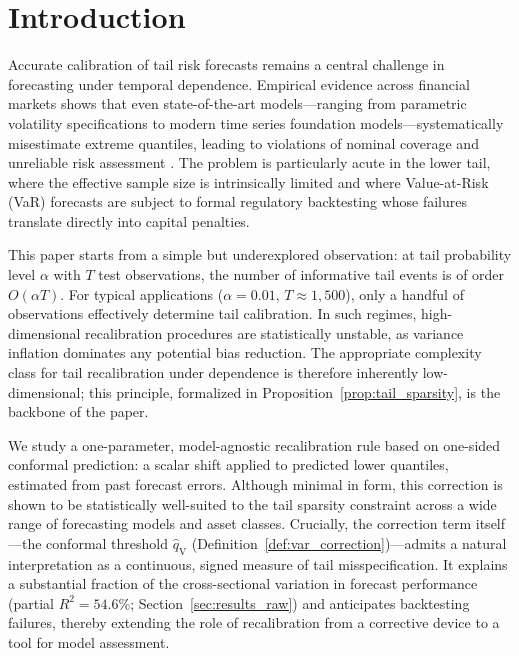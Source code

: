 \documentclass[preprint,11pt,authoryear]{elsarticle}
\newcommand{\1}{\boldsymbol{1}}
\newcommand{\qV}{\hat{q}_{\scriptscriptstyle\mathrm{V}}}
\begin{document}
	\section{Introduction}
	\label{sec:intro}

	Accurate calibration of tail risk forecasts remains a central challenge in forecasting under temporal dependence. Empirical evidence across financial markets shows that even state-of-the-art models---ranging from parametric volatility specifications to modern time series foundation models---systematically misestimate extreme quantiles, leading to violations of nominal coverage and unreliable risk assessment \citep{christoffersen1998, nolde2017elicitability, goel2024tsfmvar, pele2025llmvar}. The problem is particularly acute in the lower tail, where the effective sample size is intrinsically limited and where Value-at-Risk (VaR) forecasts are subject to formal regulatory backtesting \citep{basel1996} whose failures translate directly into capital penalties.

	This paper starts from a simple but underexplored observation: at tail probability level $\alpha$ with $T$ test observations, the number of informative tail events is of order $O(\alpha T)$. For typical applications ($\alpha = 0.01$, $T \approx 1{,}500$), only a handful of observations effectively determine tail calibration. In such regimes, high-dimensional recalibration procedures are statistically unstable, as variance inflation dominates any potential bias reduction. The appropriate complexity class for tail recalibration under dependence is therefore inherently low-dimensional; this principle, formalized in Proposition~\ref{prop:tail_sparsity}, is the backbone of the paper.

	We study a one-parameter, model-agnostic recalibration rule based on one-sided conformal prediction: a scalar shift applied to predicted lower quantiles, estimated from past forecast errors. Although minimal in form, this correction is shown to be statistically well-suited to the tail sparsity constraint across a wide range of forecasting models and asset classes. Crucially, the correction term itself---the conformal threshold $\qV$ (Definition~\ref{def:var_correction})---admits a natural interpretation as a continuous, signed measure of tail misspecification. It explains a substantial fraction of the cross-sectional variation in forecast performance (partial $R^2 = 54.6\%$; Section~\ref{sec:results_raw}) and anticipates backtesting failures, thereby extending the role of recalibration from a corrective device to a tool for model assessment.
\end{document}
